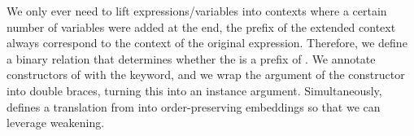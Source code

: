 We only ever need to lift expressions/variables into
contexts where a certain number of variables were added at the end, \ie{} the
prefix of the extended context always correspond to the context of the original
expression.  Therefore, we define a binary relation   
that determines whether the  is a prefix of .  We annotate
constructors of  with the  keyword, and we wrap
the argument of the  constructor into double braces, turning this into
an instance argument.  Simultaneously,  defines a translation from
 into order-preserving embeddings  so that we can
leverage weakening.
\begin{mathpar}
\end{mathpar}
